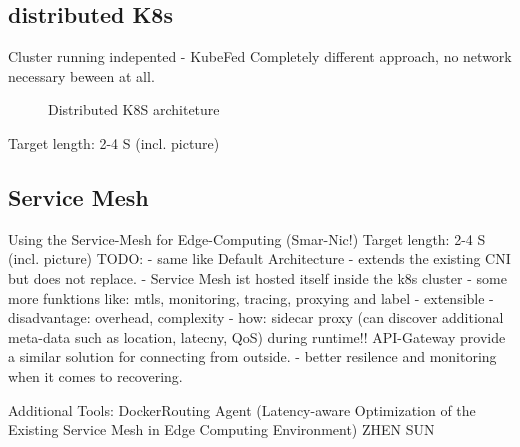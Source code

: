 \documentclass[MSC,Master,english]{twbook}%
\begin{document}
\subsection{distributed K8s}
Cluster running indepented - KubeFed
Completely different approach, no network necessary beween at all.
\begin{figure}[h]
    \centering
    \caption{Distributed \ac{K8S} architeture}
    \label{fig:default-k8s}
\end{figure}
Target length: 2-4 S (incl. picture)


\subsection{Service Mesh}
Using the Service-Mesh for Edge-Computing (Smar-Nic!)
Target length: 2-4 S (incl. picture)
TODO:
- same like Default Architecture
- extends the existing \ac{CNI} but does not replace.
- Service Mesh ist hosted itself inside the k8s cluster
- some more funktions like: mtls, monitoring, tracing, proxying and label
- extensible
- disadvantage: overhead, complexity
- how: sidecar proxy (can discover additional meta-data such as location, latecny, QoS) during runtime!! API-Gateway provide a similar solution for connecting from outside.
- better resilence and monitoring when it comes to recovering.

Additional Tools: DockerRouting Agent  (Latency-aware Optimization
of the Existing Service Mesh
in Edge Computing
Environment) ZHEN SUN
\end{document}
